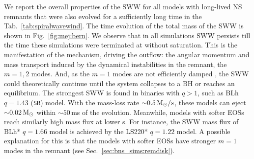 

We report the overall properties of the \ac{SWW} for all models with 
long-lived \ac{NS} remnants that were also evolved for a sufficiently long time 
in the Tab.~\ref{tab:spiralwavewind}. 
%
The time evolution of the total mass of the \ac{SWW} is shown in  Fig.~\ref{fig:mej:bern}.
We observe that in all simulations \ac{SWW} persists till the time these simulations 
were terminated at without saturation.
This is the manifestation of the mechanism, driving the outflow: the 
angular momentum and mass transport induced by the dynamical instabilities in the 
remnant, the $m=1,2$ modes. And, as the $m=1$ modes are not efficiently damped \citep{Paschalidis:2015mla,Radice:2016gym,Lehner:2016wjg,East:2016zvv},
the \ac{SWW} could theoretically continue until the system collapses to a \ac{BH} 
or reaches an equilibrium. %
%
The strongest \ac{SWW} is found in binaries with $q>1$, such as 
BLh $q=1.43$ (\texttt{SR}) model. 
With the mass-loss rate ${\sim}0.5\, {\text{M}_{\odot}}/{\text{s}}$, these models can eject 
${\sim}0.02\,{\text{M}_{\odot}}$ within ${\sim}50\,$ms of the \pmerg{} evolution.
%
Meanwhile, models with softer \acp{EOS} reach similarly high mass flux 
at lower \mr{}s. For instance, the \ac{SWW} mass flux of BLh* $q=1.66$ model 
is achieved by the LS220* $q=1.22$ model. 
A possible explanation for this is that the models with softer \acp{EOS} have stronger 
$m=1$ modes in the remnant (see Sec.~\ref{sec:bns_sims:remdisk}).

